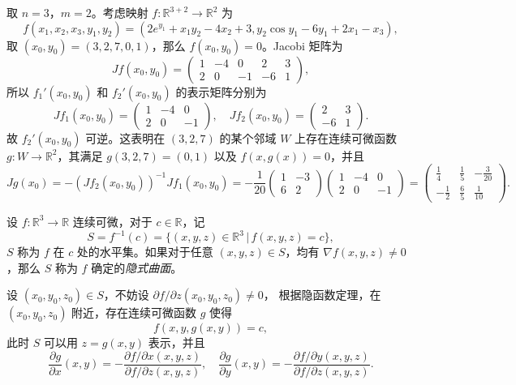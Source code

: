\documentclass[fontset=none,zihao=-4]{Notes}
\begin{document}
\begin{example}
  取 $n=3$，$m=2$。考虑映射 $f:\mathbb{R}^{3+2}\to\mathbb{R}^2$ 为
  \[
    f(x_1,x_2,x_3,y_1,y_2)=(2e^{y_1}+x_1y_2-4x_2+3,y_2\cos y_1-6y_1+2x_1-x_3),  
  \]
  取 $(x_0,y_0)=(3,2,7,0,1)$，那么 $f(x_0,y_0)=0$。Jacobi 矩阵为
  \[
    Jf(x_0,y_0)=\begin{pmatrix}
      1 & -4 & 0 & 2 & 3 \\
      2 & 0 & -1 & -6 & 1
    \end{pmatrix}  ,
  \]
  所以 $f_1'(x_0,y_0)$ 和 $f_2'(x_0,y_0)$ 的表示矩阵分别为
  \[
    Jf_1(x_0,y_0)=\begin{pmatrix}
      1 & -4 & 0 \\
      2 & 0 & -1
    \end{pmatrix},\quad
    Jf_2(x_0,y_0)=\begin{pmatrix}
      2 & 3 \\ -6 & 1
    \end{pmatrix}  .
  \]
  故 $f_2'(x_0,y_0)$ 可逆。这表明在 $(3,2,7)$ 的某个邻域 $W$ 上存在连续可微函数
  $g:W\to\mathbb{R}^2$，其满足 $g(3,2,7)=(0,1)$ 以及 $f(x,g(x))=0$，并且
  \[
    Jg(x_0)=-(Jf_2(x_0,y_0))^{-1}Jf_1(x_0,y_0)=
    -\frac{1}{20}\begin{pmatrix}
      1 & -3 \\
      6 & 2
    \end{pmatrix}\begin{pmatrix}
      1 & -4 & 0 \\
      2 & 0 & -1
    \end{pmatrix} =\begin{pmatrix}
      \frac{1}{4} & \frac{1}{5} & -\frac{3}{20} \\[2mm]
      -\frac{1}{2} & \frac{6}{5} & \frac{1}{10}
    \end{pmatrix}.
  \]
\end{example}

\begin{example}[隐式曲面]
  设 $f:\mathbb{R}^{3}\to\mathbb{R}$ 连续可微，对于 $c\in\mathbb{R}$，记
  \[
    S=f^{-1}(c)=\{(x,y,z)\in\mathbb{R}^3\,|\, f(x,y,z)=c\}  ,
  \]
  $S$ 称为 $f$ 在 $c$ 处的水平集。如果对于任意 $(x,y,z)\in S$，均有
  $\nabla f(x,y,z)\neq 0$，那么 $S$ 称为 $f$ 确定的\emph{隐式曲面}。

  设 $(x_0,y_0,z_0)\in S$，不妨设 $\partial f/\partial z(x_0,y_0,z_0)\neq 0$，
  根据隐函数定理，在 $(x_0,y_0,z_0)$ 附近，存在连续可微函数 $g$
  使得
  \[
    f(x,y,g(x,y))=c,  
  \]
  此时 $S$ 可以用 $z=g(x,y)$ 表示，并且
  \[
    \frac{\partial g}{\partial x}(x,y)
    =-\frac{\partial f/\partial x(x,y,z)}{\partial f/\partial z(x,y,z)},\quad
    \frac{\partial g}{\partial y}(x,y)
    =-\frac{\partial f/\partial y(x,y,z)}{\partial f/\partial z(x,y,z)}.
  \]
\end{example}
\end{document}
